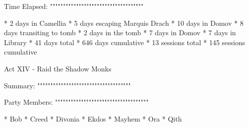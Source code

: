 Time Elapsed:
""""""""""""""""""""""""""""""""""""

  * 2 days in Camellia
  * 5 days escaping Marquis Drach
  * 10 days in Domov
  * 8 days transiting to tomb
  * 2 days in the tomb
  * 7 days in Domov
  * 7 days in Library
  * 41 days total
  * 646 days cumulative
  * 13 sessions total
  * 145 sessions cumulative

Act XIV - Raid the Shadow Monks
^^^^^^^^^^^^^^^^^^^^^^^^^^^^^^^^^^^^

Summary:
""""""""""""""""""""""""""""""""""""

Party Members:
""""""""""""""""""""""""""""""""""""

  * Bob
  * Creed
  * Divonia
  * Ekdos
  * Mayhem
  * Ora
  * Qith

